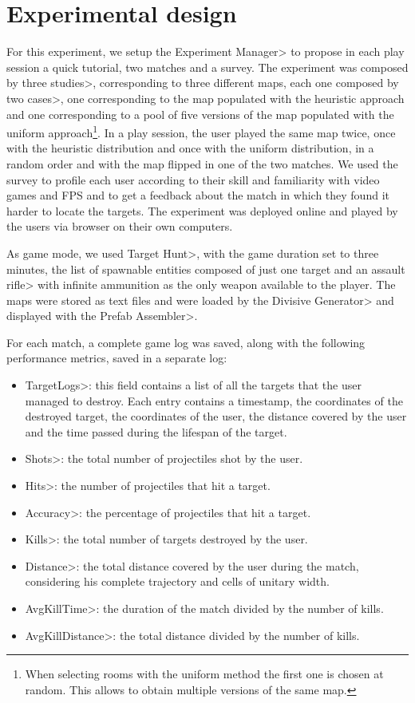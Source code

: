 
\section{Experimental design}

For this experiment, we setup the \<Experiment Manager> to propose in each play session a quick tutorial, two matches and a survey. The experiment was composed by three \<studies>, corresponding to three different maps, each one composed by two \<cases>, one corresponding to the map populated with the heuristic approach and one corresponding to a pool of five versions of the map populated with the uniform approach\footnote{When selecting rooms with the uniform method the first one is chosen at random. This allows to obtain multiple versions of the same map.}. In a play session, the user played the same map twice, once with the heuristic distribution and once with the uniform distribution, in a random order and with the map flipped in one of the two matches. We used the survey to profile each user according to their skill and familiarity with video games and FPS and to get a feedback about the match in which they found it harder to locate the targets. The experiment was deployed online and played by the users via browser on their own computers.

\par

As game mode, we used \<Target Hunt>, with the game duration set to three minutes, the list of spawnable entities composed of just one target and an \<assault rifle> with infinite ammunition as the only weapon available to the player. The maps were stored as text files and were loaded by the \<Divisive Generator> and displayed with the \<Prefab Assembler>. 

\par

For each match, a complete game log was saved, along with the following performance metrics, saved in a separate log:
\begin{itemize}
\item \<TargetLogs>: this field contains a list of all the targets that the user managed to destroy. Each entry contains a timestamp, the coordinates of the destroyed target, the coordinates of the user, the distance covered by the user and the time passed during the lifespan of the target.
\item \<Shots>: the total number of projectiles shot by the user.
\item \<Hits>: the number of projectiles that hit a target.
\item \<Accuracy>: the percentage of projectiles that hit a target.
\item \<Kills>: the total number of targets destroyed by the user.
\item \<Distance>: the total distance covered by the user during the match, considering his complete trajectory and cells of unitary width.
\item \<AvgKillTime>: the duration of the match divided by the number of kills.
\item \<AvgKillDistance>: the total distance divided by the number of kills.
\end{itemize}

